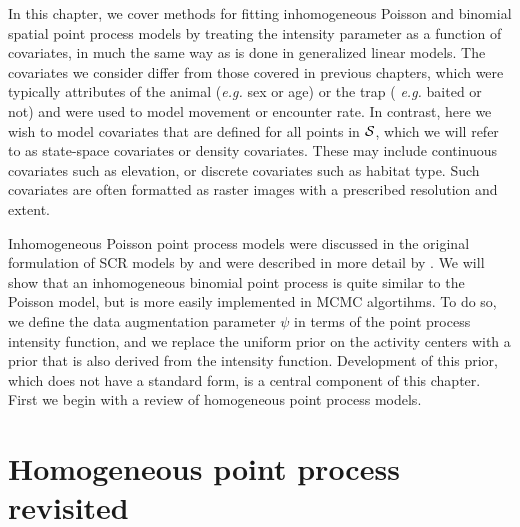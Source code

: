 In this chapter, we cover methods %
for fitting inhomogeneous Poisson and binomial
spatial point process models by treating the intensity parameter as a
function of covariates, in much the same way as is done in generalized linear
models. The covariates we consider differ
from those covered in previous chapters, which were typically
attributes of the animal ({\it e.g.} sex or age) or the trap ({\it
  e.g.} baited or not) and were used to model movement or encounter
rate. In contrast, here we wish to model covariates that are defined
for all points in $\cal S$, which we will refer to as
state-space covariates or density covariates. These may
include continuous covariates such as elevation, or discrete
covariates such as habitat type. Such covariates are often formatted
as raster images with a prescribed resolution and extent.

Inhomogeneous Poisson point process models were discussed in the original
formulation of SCR models by \citet{efford:2004} and were described in
more detail by \citet{borchers_efford:2008}. We will show that an
inhomogeneous binomial point process is quite similar to the Poisson
model, but is more easily implemented in MCMC algortihms. To do so, we
define the data augmentation parameter $\psi$ in terms of the point
process intensity function, and we replace the uniform prior on the
activity centers with a prior that is also derived from the intensity
function. Development of this prior, which does not have a
standard form, is a central component of this chapter. First we
begin with a review of homogeneous point process models.


\section{Homogeneous point process revisited}

